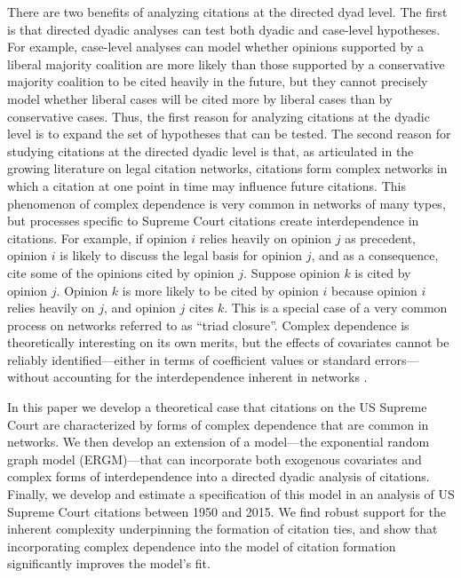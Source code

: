 \documentclass[headsepline=true, abstracton]{scrartcl}
\begin{document}
There are two benefits of analyzing citations at the directed dyad level. The first is that directed dyadic analyses can test both dyadic and case-level hypotheses. For example, case-level analyses can model whether opinions supported by a liberal majority coalition are more likely than those supported by a conservative majority coalition to be cited heavily in the future, but they cannot precisely model whether liberal cases will be cited more by liberal cases than by conservative cases. Thus, the first reason for analyzing citations at the dyadic level is to expand the set of hypotheses that can be tested. The second reason for studying citations at the directed dyadic level is that, as articulated in the growing literature on legal citation networks, citations form complex networks in which a citation at one point in time may influence future citations. This phenomenon of complex dependence is very common in networks of many types, but processes specific to Supreme Court citations create interdependence in citations. For example, if opinion $i$ relies heavily on opinion $j$ as precedent, opinion $i$ is likely to discuss the legal basis for opinion $j$, and as a consequence, cite some of the opinions cited by opinion $j$. Suppose opinion $k$ is cited by opinion $j$. Opinion $k$ is more likely to be cited by opinion $i$ because opinion $i$ relies heavily on $j$, and opinion $j$ cites $k$.  This is a special case of a very common process on networks referred to as ``triad closure''. Complex dependence is theoretically interesting on its own merits, but the effects of covariates cannot be reliably identified---either in terms of coefficient values or standard errors---without accounting for the interdependence inherent in networks \citep{cranmer2016critique}. 

In this paper we develop a theoretical case that citations on the US Supreme Court are characterized by forms of complex dependence that are common in networks. We then develop an extension of a model---the exponential random graph model (ERGM)---that can incorporate both exogenous covariates and complex forms of interdependence into a directed dyadic analysis of citations. Finally, we develop and estimate a specification of this model in an analysis of US Supreme Court citations between 1950 and 2015. We find robust support for the inherent complexity underpinning the formation of citation ties, and show that incorporating complex dependence into the model of citation formation significantly improves the model's fit.
\end{document}
